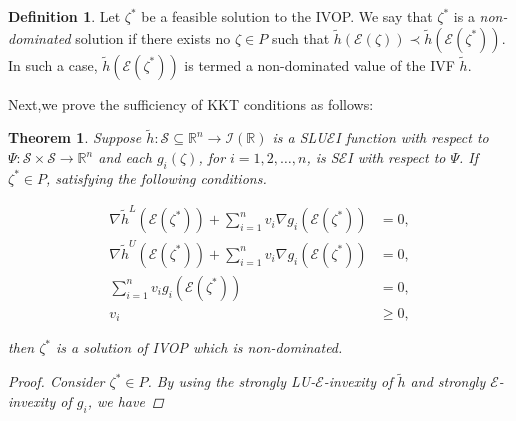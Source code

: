 \documentclass[12pt, reqno]{amsart}
\newtheorem{theorem}{Theorem}[section]
\theoremstyle{definition}
\newtheorem{definition}{Definition}[section]
\theoremstyle{remark}
\numberwithin{equation}{section}
\begin{document}
\begin{definition} \label{definition 4.1 p4}
 Let $\mathit{\zeta} ^*$ be a feasible solution to the IVOP. We say that $\mathit{\zeta} ^*$ is a \emph{non-dominated} solution if there exists no $\mathit{\zeta}  \in P$ such that $\tilde{h}(\mathcal{\mathcal{E}}(\mathit{\zeta} )) \prec \tilde{h}(\mathcal{\mathcal{E}}(\mathit{\zeta} ^*))$. In such a case, $\tilde{h}(\mathcal{\mathcal{E}}(\mathit{\zeta} ^*))$ is termed a non-dominated value of the IVF $\tilde{h}$.   
\end{definition}
Next,we prove the sufficiency of KKT conditions as follows:
\begin{theorem} \label{theorem 4.3 p4}
    Suppose $\tilde{h}:\mathcal{S}\subseteq \mathbb{R}^n\rightarrow \mathcal{I}(\mathbb{R})$ is a  SLU$\mathcal{\mathcal{E}}$I function with respect to $\Psi : \mathcal{S} \times \mathcal{S} \to \mathbb{R}^n$ and  each $g_i(\mathit{\zeta} )$, for $i = 1, 2, \ldots, n$, is S$\mathcal{\mathcal{E}}$I with respect to $\Psi$. If $\mathit{\zeta} ^* \in P$, satisfying the following conditions.
    
    \begin{equation*}
        \begin{aligned}
             \nabla\tilde{h}^L(\mathcal{E}(\mathit{\zeta} ^*))  + \sum_{i=1}^n v_i \nabla g_i(\mathcal{E}(\mathit{\zeta} ^*)) &= 0, \\
             \nabla\tilde{h}^U(\mathcal{E}(\mathit{\zeta} ^*)) + \sum_{i=1}^n v_i \nabla g_i(\mathcal{E}(\mathit{\zeta} ^*)) &= 0, \\
    \sum_{i=1}^n v_i g_i(\mathcal{E}(\mathit{\zeta} ^*)) &= 0, \\
    v_i &\geq 0,
        \end{aligned}
    \end{equation*}
    
    then $\mathit{\zeta} ^*$ is a solution of IVOP which is non-dominated.

  \begin{proof}
     Consider $\zeta^* \in P$. By using the  strongly LU-$\mathcal{E}$-invexity of $\tilde{h}$ and strongly $\mathcal{E}$-invexity of $g_i$, we have 
    

\end{proof}
\end{theorem}
\end{document}

